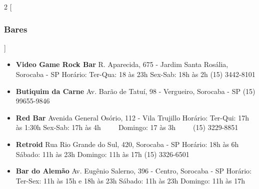 \begin{multicols}{2}
  [
  \subsubsection{Bares}
  ]
  \begin{itemize}
    \item \textbf{Video Game Rock Bar}
      \newline R. Aparecida, 675 - Jardim Santa Rosália, Sorocaba - SP
      \newline Horário: Ter-Qua: 18 às 23h Sex-Sab: 18h às 2h
      \newline (15) 3442-8101
  \end{itemize}
  \begin{itemize}
    \item \textbf{Butiquim da Carne}
      \newline Av. Barão de Tatuí, 98 - Vergueiro, Sorocaba - SP
      \newline (15) 99655-9846
  \end{itemize}
    \begin{itemize}
    \item \textbf{Red Bar}
      \newline Avenida General Osório, 112 - Vila Trujillo
      \newline Horário: Ter-Qui: 17h às 1:30h
      \newline Sex-Sab: 17h às 4h
      \newline Domingo: 17 às 3h
      \newline (15) 3229-8851
  \end{itemize}
  \begin{itemize}
    \item \textbf{Retroid}
      \newline Rua Rio Grande do Sul, 420, Sorocaba - SP
      \newline Horário: 18h às 6h
      \newline Sábado: 11h às 23h Domingo: 11h às 17h
      \newline (15) 3326-6501
  \end{itemize}
  \begin{itemize}
    \item \textbf{Bar do Alemão}
      \newline Av. Eugênio Salerno, 396 - Centro, Sorocaba - SP
      \newline Horário: Ter-Sex: 11h às 15h e 18h às 23h
      \newline Sábado: 11h às 23h Domingo: 11h às 17h

\end{itemize}
\end{multicols}
